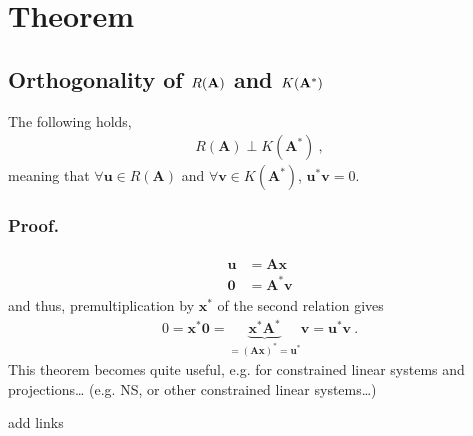 \documentclass[letterpaper,10pt,english]{jupyterBook}
\begin{document}
\section{Theorem}
\label{\detokenize{ch/linear-algebra/matrices:theorem}}\label{\detokenize{ch/linear-algebra/matrices:math-linear-algebra-thms}}

\subsection{Orthogonality of \protect\(R(\mathbf{A})\protect\) and \protect\(K(\mathbf{A^*})\protect\)}
\label{\detokenize{ch/linear-algebra/matrices:orthogonality-of-r-mathbf-a-and-k-mathbf-a}}\label{\detokenize{ch/linear-algebra/matrices:math-linear-algebra-thms-raperpkah}}
\sphinxAtStartPar
The following holds,
\begin{equation*}
\begin{split}R(\mathbf{A}) \perp K(\mathbf{A^*}) \ ,\end{split}
\end{equation*}
\sphinxAtStartPar
meaning that \(\forall \mathbf{u} \in R(\mathbf{A})\) and \(\forall \mathbf{v} \in K(\mathbf{A}^*)\), \(\mathbf{u}^* \mathbf{v} = 0\).
\subsubsection*{Proof.}
\begin{equation*}
\begin{split}\begin{aligned}
  \mathbf{u} & = \mathbf{A} \mathbf{x} \\
  \mathbf{0} & = \mathbf{A}^* \mathbf{v} 
\end{aligned}\end{split}
\end{equation*}
\sphinxAtStartPar
and thus, premultiplication by \(\mathbf{x}^*\) of the second relation gives
\begin{equation*}
\begin{split}0 = \mathbf{x}^* \mathbf{0} = \underbrace{\mathbf{x}^* \mathbf{A}^*}_{=(\mathbf{A}  \mathbf{x})^* = \mathbf{u}^*} \mathbf{v} = \mathbf{u}^* \mathbf{v} \ .\end{split}
\end{equation*}
\sphinxAtStartPar
This theorem becomes quite useful, e.g. for constrained linear systems and projections… (e.g. N\sphinxhyphen{}S, or other constrained linear systems…)

\sphinxAtStartPar
{} add links
\end{document}
